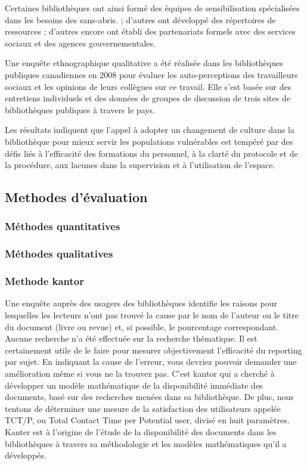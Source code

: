 \documentclass[french,a4paper,12pt]{article}
\begin{document}
Certaines bibliothèques ont ainsi formé des équipes de sensibilisation spécialisées dans les besoins des sans-abris. ; d'autres ont développé des répertoires de ressources ; d'autres encore ont établi des partenariats formels avec des services sociaux et des agences gouvernementales. 
 
Une enquête ethnographique qualitative a été réalisée dans les bibliothèques publiques canadiennes en 2008 pour évaluer les auto-perceptions des travailleurs sociaux et les opinions de leurs collègues sur ce travail. Elle s’est basée sur des entretiens individuels et des données de groupes de discussion de trois sites de bibliothèques publiques à travers le pays. 

Les résultats indiquent que l'appel à adopter un changement de culture dans la bibliothèque pour mieux servir les populations vulnérables est tempéré par des défis liés à l'efficacité des formations du personnel, à la clarté du protocole et de la procédure, aux lacunes dans la supervision et à l'utilisation de l'espace. 

 

 







\subsection{Methodes d'évaluation}

\subsubsection{Méthodes quantitatives}


\subsubsection{Méthodes qualitatives}

\subsubsection{Methode kantor }

\quad Une enquête auprès des usagers des bibliothèques identifie les raisons pour lesquelles les lecteurs n'ont pas trouvé la cause par le nom de l'auteur ou le titre du document (livre ou revue) et, si possible, le pourcentage correspondant. Aucune recherche n'a été effectuée sur la recherche thématique.
Il est certainement utile de le faire pour mesurer objectivement l'efficacité du reporting par sujet. En indiquant la cause de l'erreur, vous devriez pouvoir demander une amélioration même si vous ne la trouvez pas. 
\quad C'est kantor qui a cherché à développer un modèle mathématique de la disponibilité immédiate des documents, basé sur des recherches menées dans sa bibliothèque. De plus, nous tentons de déterminer une mesure de la satisfaction des utilisateurs appelée TCT/P, ou Total Contact Time per Potential user, divisé en huit paramètres. Kanter est à l'origine de l'étude de la disponibilité des documents dans les bibliothèques à travers sa méthodologie et les modèles mathématiques qu'il a développés.
\end{document}
